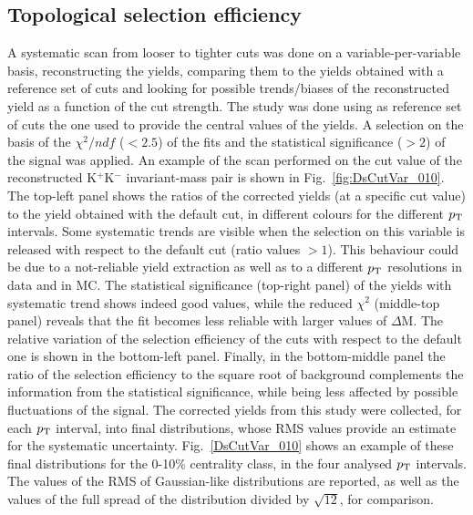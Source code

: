 \subsection{Topological selection efficiency}
\label{sec:CutVarsystAA}
A systematic scan from looser to tighter cuts was done on a variable-per-variable 
basis, reconstructing the yields, comparing them to the yields obtained 
with a reference set of cuts and looking for possible trends/biases of 
the reconstructed yield as a function of the cut strength.
The study was done using as reference set of cuts the one used 
to provide the central values of the yields. A selection
on the basis of the $\chi^2/ndf$ ($<2.5$) of the fits and the statistical significance ($>2$)
of the signal was applied.  
An example of the scan performed on the cut value of the
reconstructed K$^+$K$^-$ invariant-mass pair is shown in Fig.~\ref{fig:DsCutVar_010}.
The top-left panel shows the ratios of the corrected yields 
(at a specific cut value) to the yield obtained with the default
cut, in different colours for the different $p_{\rm T}$ intervals.
Some systematic trends are visible when the selection
on this variable is released with respect to the default cut (ratio values $>1$). 
This behaviour could be due to a not-reliable yield
extraction as well as to a different $p_{\rm T}$ resolutions in data and in MC.
The statistical significance (top-right panel) of the yields with systematic trend shows indeed good
values, while the reduced $\chi^2$ (middle-top panel) reveals that the fit becomes
less reliable with larger values of $\Delta$M. The relative variation of the selection
efficiency of the cuts with respect to the default one is shown in the bottom-left panel.
Finally, in the bottom-middle panel the ratio of the selection efficiency to the square root of 
background complements the information from the statistical significance,
while being less affected by possible fluctuations of the signal.
The corrected yields from this study were collected, for each $p_{\rm T}$ interval,
into final distributions, whose RMS values provide an estimate for the systematic uncertainty.
Fig.~\ref{DsCutVar_010} shows an example of these final distributions 
for the 0-10\% centrality class, in the four analysed $p_{\rm T}$ intervals. 
The values of the RMS of Gaussian-like distributions are reported, as well as
the values of the full spread of the distribution divided by $\sqrt{12}$,
for comparison.


